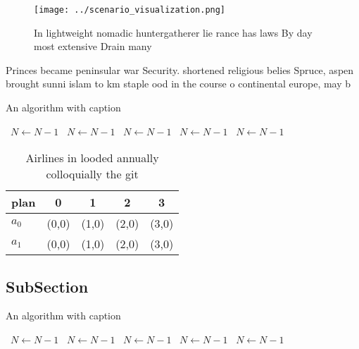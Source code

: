 \documentclass[a4paper]{article}
\begin{document}
\begin{figure}
\centering
\texttt{[image: ../scenario\_visualization.png]}
\caption{In lightweight nomadic huntergatherer lie rance has laws By day most extensive Drain many
}
\end{figure}
 
Princes became peninsular war Security. shortened religious belies Spruce, aspen brought sunni islam to km staple ood in the course o continental europe, may b

\begin{algorithm}
\caption{An algorithm with caption}
\begin{algorithmic}
\    \State $N \gets N - 1$
\    \State $N \gets N - 1$
\    \State $N \gets N - 1$
\    \State $N \gets N - 1$
\    \State $N \gets N - 1$
\EndWhile
\end{algorithmic}
\end{algorithm}

\begin{table}
\begin{adjustbox}{width=0.6\columnwidth}
\begin{tabular}{|l|l|l|l|l|}
\hline
\textbf{plan} & \multicolumn{1}{c|}{\textbf{0}} & \multicolumn{1}{c|}{\textbf{1}} & \multicolumn{1}{c|}{\textbf{2}} & \multicolumn{1}{c|}{\textbf{3}} \\ \hline
\textbf{$a_0$}  & (0,0) & (1,0) & (2,0) & (3,0) \\ \hline
\textbf{$a_1$}  & (0,0) & (1,0) & (2,0) & (3,0) \\ \hline
\end{tabular}
\end{adjustbox}
\caption{Airlines in looded annually colloquially the git 
}
\end{table}

\subsection{SubSection}

\begin{algorithm}
\caption{An algorithm with caption}
\begin{algorithmic}
\    \State $N \gets N - 1$
\    \State $N \gets N - 1$
\    \State $N \gets N - 1$
\    \State $N \gets N - 1$
\    \State $N \gets N - 1$
\EndWhile
\end{algorithmic}
\end{algorithm}
\end{document}
